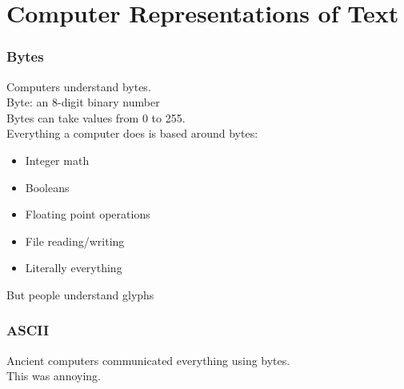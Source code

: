 \documentclass[smaller,xcolor=table,aspectratio=169]{beamer}
\begin{document}
						\section{Computer Representations of Text}

						\begin{frame}
							\frametitle{Bytes}
							Computers understand bytes.\\\pause{}
							Byte: an 8-digit binary number\\\pause{}
							Bytes can take values from 0 to 255.\\\pause{}
							Everything a computer does is based around bytes:\\\pause{}
							\begin{itemize}
								\item Integer math
								\item Booleans
								\item Floating point operations
								\item File reading/writing
								\item Literally everything
							\end{itemize}
							But people understand glyphs
						\end{frame}

						\begin{frame}
							\frametitle{ASCII}
							Ancient computers communicated everything using bytes.\\
							This was annoying.
						\end{frame}
\end{document}

